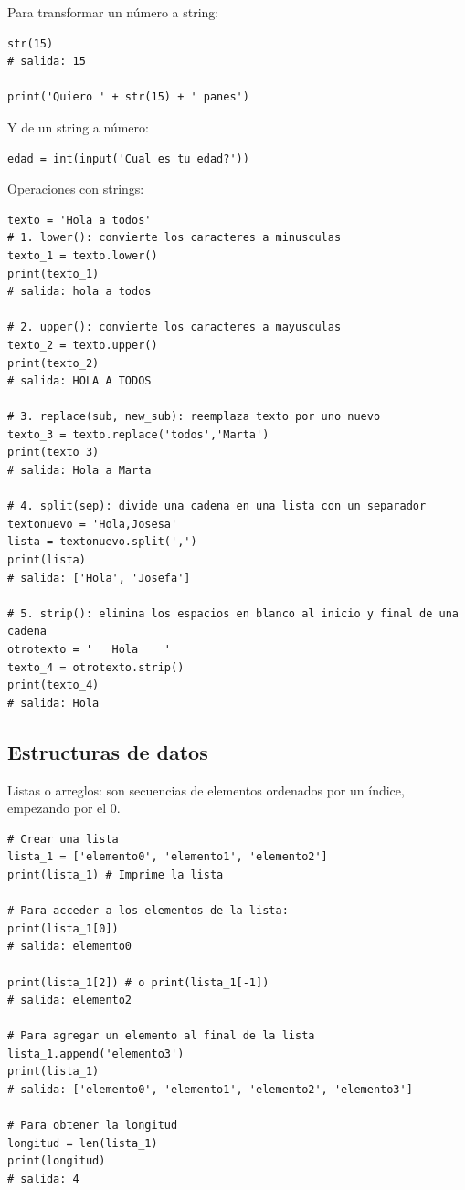 \documentclass[a4paper, 12pt]{book}
\begin{document}
Para transformar un número a string:
\begin{verbatim}
str(15)
# salida: 15
	
print('Quiero ' + str(15) + ' panes')
\end{verbatim}
Y de un string a número:
\begin{verbatim}
edad = int(input('Cual es tu edad?'))
\end{verbatim}
Operaciones con strings:
\begin{verbatim}
texto = 'Hola a todos'
# 1. lower(): convierte los caracteres a minusculas
texto_1 = texto.lower()
print(texto_1)
# salida: hola a todos
	
# 2. upper(): convierte los caracteres a mayusculas
texto_2 = texto.upper()
print(texto_2)
# salida: HOLA A TODOS
	
# 3. replace(sub, new_sub): reemplaza texto por uno nuevo
texto_3 = texto.replace('todos','Marta')
print(texto_3)
# salida: Hola a Marta
	
# 4. split(sep): divide una cadena en una lista con un separador
textonuevo = 'Hola,Josesa'
lista = textonuevo.split(',')
print(lista)
# salida: ['Hola', 'Josefa']
	
# 5. strip(): elimina los espacios en blanco al inicio y final de una cadena
otrotexto = '	Hola	'
texto_4 = otrotexto.strip()
print(texto_4)
# salida: Hola
\end{verbatim}

\subsection{Estructuras de datos}
Listas o arreglos: son secuencias de elementos ordenados por un índice, empezando por el 0.
\begin{verbatim}
# Crear una lista
lista_1 = ['elemento0', 'elemento1', 'elemento2']
print(lista_1) # Imprime la lista

# Para acceder a los elementos de la lista:
print(lista_1[0])
# salida: elemento0
	
print(lista_1[2]) # o print(lista_1[-1])
# salida: elemento2
	
# Para agregar un elemento al final de la lista
lista_1.append('elemento3')
print(lista_1)
# salida: ['elemento0', 'elemento1', 'elemento2', 'elemento3']
	
# Para obtener la longitud
longitud = len(lista_1)
print(longitud)
# salida: 4
\end{verbatim}
\end{document}
